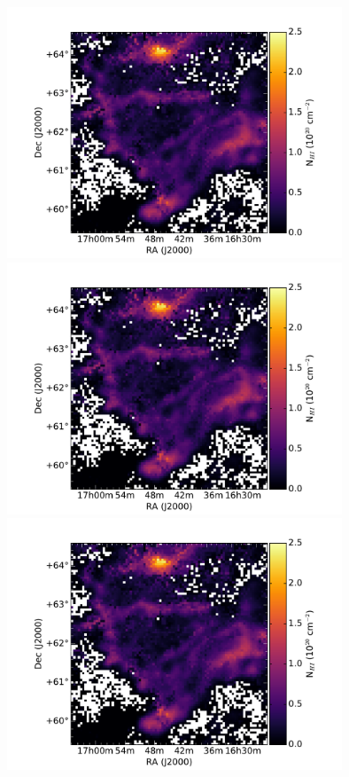 \documentclass[traditabstract]{aa}
\begin{document}



\begin{figure}[h]
  \centering
  \includegraphics[page=1,height=7.5cm,trim=110 35 105 75,clip=true]{Figures/GHIGLS_NHI.pdf}
  \hspace{5mm}
  \includegraphics[page=4,height=7.5cm,trim=110 35 105 75,clip=true]{Figures/GHIGLS_NHI.pdf} \\
  \vspace{5mm}
  \includegraphics[page=2,height=7.5cm,trim=110 35 105 75,clip=true]{Figures/GHIGLS_NHI.pdf}

\end{figure}
\end{document}
